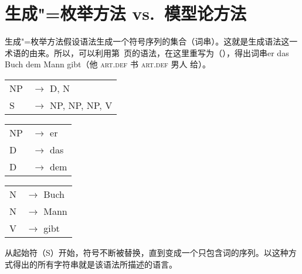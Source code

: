 
\chapter{生成"=枚举方法 vs.\ 模型论方法}
\label{Abschnitt-Generativ-Modelltheoretisch}

生成"=枚举方法假设语法生成一个符号序列的集合（词串）。这就是生成语法这一术语的由来。所以，可以利用第~\pageref{bsp-grammatik-psg}页的语法，在这里重写为（），得出词串er das Buch dem Mann gibt（他 \textsc{art}.\textsc{def} 书 \textsc{art}.\textsc{def} 男人 给）。
\ea
\label{bsp-grammatik-psg-zwei}
\begin{tabular}[t]{@{}l@{ }l}
{NP} & {$\to$ D, N}\\          
{S}  & {$\to$ NP, NP, NP, V}
\end{tabular}\hspace{2cm}%
\begin{tabular}[t]{@{}l@{ }l}
{NP} & {$\to$ er}\\
{D}  & {$\to$ das}\\
{D}  & {$\to$ dem}\\
\end{tabular}\hspace{8mm}
\begin{tabular}[t]{@{}l@{ }l}
{N} & {$\to$ Buch}\\
{N} & {$\to$ Mann}\\
{V} & {$\to$ gibt}\\
\end{tabular}
\z
从起始符（S）开始，符号不断被替换，直到变成一个只包含词的序列。以这种方式得出的所有字符串就是该语法所描述的语言。

